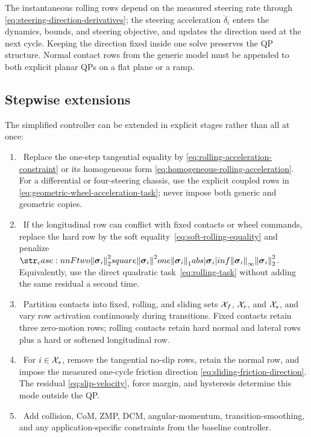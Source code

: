 \documentclass[10pt]{article}
\newcommand{\slackVariable}{\bs{\sigma}}
\begin{document}
The instantaneous rolling rows depend on the measured steering rate through
\eqref{eq:steering-direction-derivatives}; the steering acceleration
$\ddot\delta_i$ enters the dynamics, bounds, and steering objective, and
updates the direction used at the next cycle. Keeping the direction fixed
inside one solve preserves the QP structure. Normal contact rows from the
generic model must be appended to both explicit planar QPs on a flat plane or
a ramp.

\subsection{Stepwise extensions}

The simplified controller can be extended in explicit stages rather than all
at once:
\begin{enumerate}
  \item {}\ Replace the
    one-step tangential equality by
    \eqref{eq:rolling-acceleration-constraint} or its homogeneous form
    \eqref{eq:homogeneous-rolling-acceleration}. For a differential or
    four-steering chassis, use the explicit coupled rows in
    \eqref{eq:geometric-wheel-acceleration-task}; never impose both generic
    and geometric copies.
  \item {}\ If the longitudinal row can conflict
    with fixed contacts or wheel commands, replace the hard row by the soft
    equality~\eqref{eq:soft-rolling-equality} and penalize
    $\norm{\slackVariable_i}_2^2$. Equivalently, use the direct quadratic
    task~\eqref{eq:rolling-task} without adding the same residual a second
    time.
  \item {}\ Partition contacts
    into fixed, rolling, and sliding sets $\mathcal{X}_{f}$, $\mathcal{X}_{r}$, and
    $\mathcal{X}_{s}$, and vary row activation continuously during transitions.
    Fixed contacts retain three zero-motion rows; rolling contacts retain
    hard normal and lateral rows plus a hard or softened longitudinal row.
  \item {}\ For $i\in\mathcal{X}_{s}$,
    remove the tangential no-slip rows, retain the normal row, and impose the
    measured one-cycle friction direction
    \eqref{eq:sliding-friction-direction}. The residual
    \eqref{eq:slip-velocity}, force margin, and hysteresis determine this
    mode outside the QP.
  \item {}\ Add collision,
    CoM, ZMP, DCM, angular-momentum, transition-smoothing, and any
    application-specific constraints from the baseline controller.
\end{enumerate}
\end{document}
